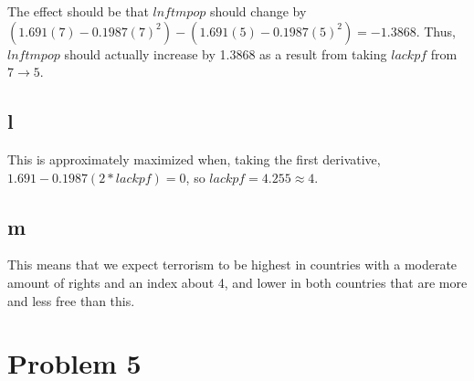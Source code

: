 \documentclass[12pt,letterpaper]{article}
\theoremstyle{definition}
\begin{document}
The effect should be that $lnftmpop$ should change by $(1.691(7) - 0.1987(7)^{2}) - (1.691(5) - 0.1987(5)^{2}) = -1.3868$. Thus, $lnftmpop$ should actually increase by 1.3868 as a result from taking $lackpf$ from $7 \rightarrow 5$.

\subsection*{l}

This is approximately maximized when, taking the first derivative, $1.691 - 0.1987(2 * lackpf) = 0$, so $lackpf = 4.255 \approx 4$.

\subsection*{m}

This means that we expect terrorism to be highest in countries with a moderate amount of rights and an index about 4, and lower in both countries that are more and less free than this.

\break
\section*{Problem 5}
\end{document}
